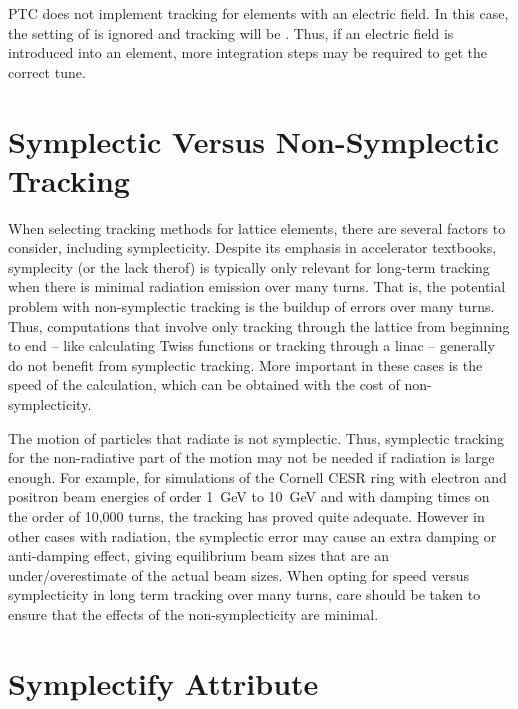 PTC does not implement  tracking for elements with an electric field. In this case,
the setting of  is ignored and tracking will be . Thus, if
an electric field is introduced into an element, more integration steps may be required to get the
correct tune.

\section{Symplectic Versus Non-Symplectic Tracking}
\label{s:non.symp}

When selecting tracking methods for lattice elements, there are several factors to consider,
including symplecticity. Despite its emphasis in accelerator textbooks, symplecity (or the lack
therof) is typically only relevant for long-term tracking when there is minimal radiation emission
over many turns. That is, the potential problem with non-symplectic tracking is the buildup of
errors over many turns. Thus, computations that involve only tracking through the lattice from
beginning to end -- like calculating Twiss functions or tracking through a linac -- generally do not
benefit from symplectic tracking. More important in these cases is the speed of the calculation, 
which can be obtained with the cost of non-symplecticity.

The motion of particles that radiate is not symplectic. Thus, symplectic tracking for the
non-radiative part of the motion may not be needed if radiation is large enough. For example, for
simulations of the Cornell CESR ring with electron and positron beam energies of order 1~GeV to
10~GeV and with damping times on the order of 10,000 turns, the  tracking has
proved quite adequate. However in other cases with radiation, the symplectic error may cause an 
extra damping or anti-damping effect, giving equilibrium beam sizes that are an under/overestimate 
of the actual beam sizes. When opting for speed versus symplecticity in long term tracking over 
many turns, care should be taken to ensure that the effects of the non-symplecticity are minimal.

\section{Symplectify Attribute}
\label{s:symp}

